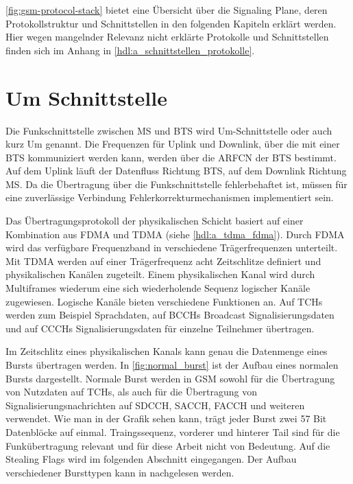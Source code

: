 \autoref{fig:gsm-protocol-stack} bietet eine Übersicht über die Signaling Plane, deren Protokollstruktur und Schnittstellen in den folgenden Kapiteln erklärt werden. Hier wegen mangelnder Relevanz nicht erklärte Protokolle und Schnittstellen finden sich im Anhang in \autoref{hdl:a_schnittstellen_protokolle}.

\section{Um Schnittstelle} \label{hdl:einfuehrung-gsm_schnittstellen_protokolle-um_interface}


Die Funkschnittstelle zwischen \ac{MS} und \ac{BTS} wird \ac{Um}-Schnittstelle oder auch kurz \ac{Um} genannt. Die Frequenzen für Uplink und Downlink, über die mit einer \ac{BTS} kommuniziert werden kann, werden über die \ac{ARFCN} der \ac{BTS} bestimmt. Auf dem Uplink läuft der Datenfluss Richtung \ac{BTS}, auf dem Downlink Richtung \ac{MS}. Da die Übertragung über die Funkschnittstelle fehlerbehaftet ist, müssen für eine zuverlässige Verbindung Fehlerkorrekturmechanismen implementiert sein.

Das Übertragungsprotokoll der physikalischen Schicht basiert auf einer Kombination aus \ac{FDMA} und \ac{TDMA} (siehe \autoref{hdl:a_tdma_fdma}). Durch \ac{FDMA} wird das verfügbare Frequenzband in verschiedene Trägerfrequenzen unterteilt. Mit \ac{TDMA} werden auf einer Trägerfrequenz acht Zeitschlitze definiert und physikalischen Kanälen zugeteilt. Einem physikalischen Kanal wird durch Multiframes wiederum eine sich wiederholende Sequenz logischer Kanäle zugewiesen. Logische Kanäle bieten verschiedene Funktionen an. Auf \acp{TCH} werden zum Beispiel Sprachdaten, auf \acp{BCCH} Broadcast Signalisierungsdaten und auf \acp{CCCH} Signalisierungsdaten für einzelne Teilnehmer übertragen.

Im Zeitschlitz eines physikalischen Kanals kann genau die Datenmenge eines Bursts übertragen werden. In \autoref{fig:normal_burst} ist der Aufbau eines normalen Bursts dargestellt. Normale Burst werden in \ac{GSM} sowohl für die Übertragung von Nutzdaten auf \acp{TCH}, als auch für die Übertragung von Signalisierungsnachrichten auf \ac{SDCCH}, \ac{SACCH}, \ac{FACCH} und weiteren verwendet. Wie man in der Grafik sehen kann, trägt jeder Burst zwei 57 Bit Datenblöcke auf einmal. Traingssequenz, vorderer und hinterer Tail sind für die Funkübertragung relevant und für diese Arbeit nicht von Bedeutung. Auf die Stealing Flags wird im folgenden Abschnitt eingegangen. Der Aufbau verschiedener Bursttypen kann in  nachgelesen werden.

